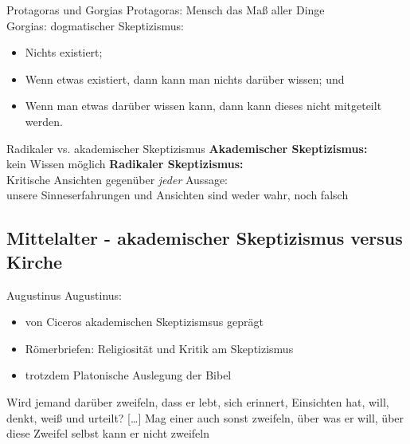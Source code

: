 \documentclass[12pt]{beamer}
\begin{document}
\begin{frame}{Protagoras und Gorgias}
Protagoras: Mensch das Maß aller Dinge\\%
Gorgias: dogmatischer Skeptizismus:
\begin{itemize}
\item Nichts existiert;
\item Wenn etwas existiert, dann kann man nichts darüber wissen; und
\item Wenn man etwas darüber wissen kann, dann kann dieses nicht mitgeteilt werden.%
\end{itemize}
\end{frame}

\begin{frame}{Radikaler vs. akademischer Skeptizismus}
\textbf{Akademischer Skeptizismus:}\\
kein Wissen möglich
\textbf{Radikaler Skeptizismus:}\\
Kritische Ansichten gegenüber \emph{jeder} Aussage:\\
\glqq unsere Sinneserfahrungen und Ansichten sind weder wahr, noch falsch\grqq\ %
\end{frame}

\subsection{Mittelalter - akademischer Skeptizismus versus Kirche}
\begin{frame}{Augustinus}
Augustinus:
\begin{itemize}
\item von Ciceros akademischen Skeptizismsus geprägt
\item Römerbriefen: Religiosität und Kritik am Skeptizismus
\item trotzdem Platonische Auslegung der Bibel
\end{itemize}
\glqq Wird jemand darüber zweifeln, dass er lebt, sich erinnert, Einsichten hat, will, denkt, weiß und urteilt? [\ldots] Mag einer auch sonst zweifeln, über was er will, über diese Zweifel selbst kann er nicht zweifeln\grqq\ %
\end{frame}
\end{document}
